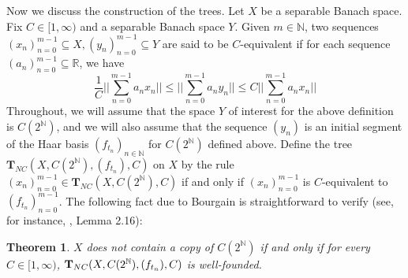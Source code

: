 \documentclass{article}
\newtheorem{theorem}{Theorem}
\newcommand{\N}{\mathbb N}
\newcommand{\R}{\mathbb R}
\begin{document}
Now we discuss the construction of the trees. Let $X$ be a separable Banach space.  Fix $C\in[1,\infty)$ and a separable Banach space $Y$. Given $m\in\N$, two sequences $(x_n)_{n=0}^{m-1}\subseteq X, (y_n)_{n=0}^{m-1}\subseteq Y$ are said to be $C$-equivalent if for each sequence $(a_n)_{n=0}^{m-1}\subseteq\R$, we have
\begin{equation*}
\frac{1}{C}\bigg|\bigg|\sum_{n=0}^{m-1} a_n x_n\bigg|\bigg|\leq \bigg|\bigg|\sum_{n=0}^{m-1} a_n y_n\bigg|\bigg|\leq C\bigg|\bigg|\sum_{n=0}^{m-1} a_n x_n\bigg|\bigg|
\end{equation*}
Throughout, we will assume that the space $Y$ of interest for the above definition is $C(2^\N)$, and we will also assume that the sequence $(y_n)$ is an initial segment of the Haar basis $(f_{t_n})_{n\in\N}$ for $C(2^\N)$ defined above. Define the tree $\textbf{T}_{NC}(X,C(2^\N),(f_{t_n}),C)$ on $X$ by the rule $(x_n)_{n=0}^{m-1}\in \textbf{T}_{NC}(X,C(2^\N),C)$ if and only if $(x_n)_{n=0}^{m-1}$ is $C$-equivalent to $(f_{t_n})_{n=0}^{m-1}$. The following fact due to Bourgain is straightforward to verify (see, for instance, \cite{D}, Lemma 2.16):

\begin{theorem}\label{WFR}
$X$ does not contain a copy of $C(2^\N)$ if and only if for every $C\in [1,\infty)$, $\\ \textbf{T}_{NC}(X,C(2^\N),(f_{t_n}),C)$ is well-founded.
\end{theorem}
\end{document}
